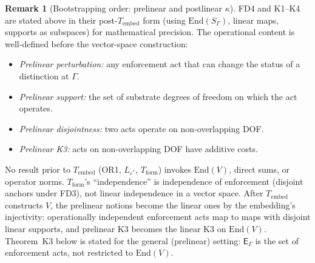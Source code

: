 \documentclass[11pt,a4paper]{article}
\theoremstyle{definition}
\newtheorem{remark}[theorem]{Remark}
\newcommand{\eps}{\varepsilon}
\newcommand{\End}{\mathrm{End}}
\begin{document}
\begin{remark}[Bootstrapping order: prelinear and postlinear $\kappa$]\label{rem:bootstrap}
FD4 and K1--K4 are stated above in their post-$T_{\mathrm{embed}}$ form (using $\End(S_\Gamma)$, linear maps, supports as subspaces) for mathematical precision.  The operational content is well-defined before the vector-space construction:
\begin{itemize}[nosep,leftmargin=2em,itemsep=2pt]
\item \textit{Prelinear perturbation:} any enforcement act that can change the status of a distinction at $\Gamma$.
\item \textit{Prelinear support:} the set of substrate degrees of freedom on which the act operates.
\item \textit{Prelinear disjointness:} two acts operate on non-overlapping DOF.
\item \textit{Prelinear K3:} acts on non-overlapping DOF have additive costs.
\end{itemize}
No result prior to $T_{\mathrm{embed}}$ (OR1, $L_{\eps^*}$, $T_{\mathrm{form}}$) invokes $\End(V)$, direct sums, or operator norms.  $T_{\mathrm{form}}$'s ``independence'' is independence of enforcement (disjoint anchors under FD3), not linear independence in a vector space.  After $T_{\mathrm{embed}}$ constructs $V$, the prelinear notions become the linear ones by the embedding's injectivity: operationally independent enforcement acts map to maps with disjoint linear supports, and prelinear K3 becomes the linear K3 on $\End(V)$.  Theorem~K3 below is stated for the general (prelinear) setting: $\mathsf{E}_\Gamma$ is the set of enforcement acts, not restricted to $\End(V)$.
\end{remark}
\end{document}

